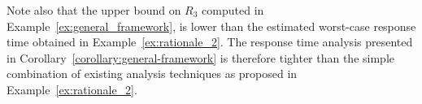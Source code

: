 Note also that the upper bound on $R_3$ computed in
Example~\ref{ex:general_framework}, is lower than the estimated worst-case response time obtained in Example~\ref{ex:rationale_2}. The response time analysis presented in Corollary~\ref{corollary:general-framework} is therefore tighter than the simple combination of existing analysis techniques as proposed in Example~\ref{ex:rationale_2}.





